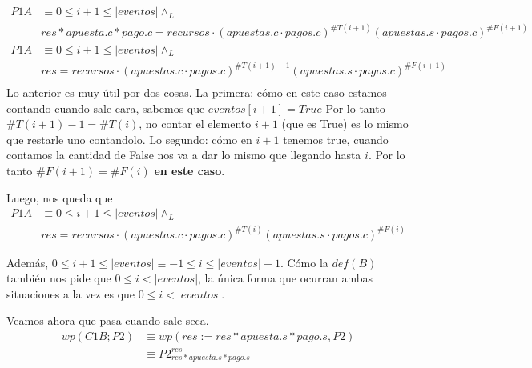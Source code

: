 \documentclass[../document.tex]{subfiles}
\begin{document}
\begin{equation} \label{eq2.a}
\begin{split}
P1A & \equiv 0\leq i+1 \leq |eventos| \land_L \\& res * apuesta.c * pago.c = recursos \cdot (apuestas.c\cdot pagos.c)^{\#T(i+1)}(apuestas.s\cdot pagos.c)^{\#F(i+1)}\\
P1A & \equiv 0\leq i+1 \leq |eventos| \land_L \\& res = recursos \cdot (apuestas.c\cdot pagos.c)^{\#T(i+1)-1}(apuestas.s\cdot pagos.c)^{\#F(i+1)}\\
\end{split}
\end{equation}
Lo anterior es muy útil por dos cosas.
La primera: cómo en este caso estamos contando cuando sale cara, sabemos que $eventos[i+1] = True$ Por lo tanto $\#T(i+1)-1=\#T(i)$, no contar el elemento $i+1$ (que es True) es lo mismo que restarle uno contandolo. Lo segundo: cómo en $i+1$ tenemos true, cuando contamos la cantidad de False nos va a dar lo mismo que llegando hasta $i$. Por lo tanto $\#F(i+1)=\#F(i)$ \textbf{en este caso}.

Luego, nos queda que
\begin{equation} 
    \begin{split}
    P1A & \equiv 0\leq i+1 \leq |eventos| \land_L \\& res = recursos \cdot (apuestas.c\cdot pagos.c)^{\#T(i)}(apuestas.s\cdot pagos.c)^{\#F(i)}
    \end{split}
\end{equation}

Además, $0\leq i+1 \leq |eventos| \equiv -1\leq i \leq |eventos|-1$. Cómo la $def(B)$ también nos pide que $0 \leq i < |eventos|$, la única forma que ocurran ambas situaciones a la vez es que $0\leq i < |eventos|$.

Veamos ahora que pasa cuando sale seca.
\begin{equation} \label{eq2.a}
\begin{split}
wp(C1B;P2) & \equiv wp(res := res * apuesta.s * pago.s, P2) \\
           & \equiv P2^{res}_{res * apuesta.s * pago.s} \\
\end{split}
\end{equation}
\end{document}
